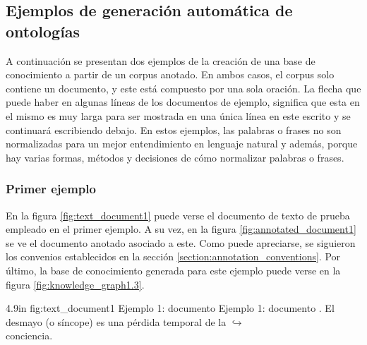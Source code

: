\subsection{Ejemplos de generación automática de ontologías}
A continuación se presentan dos ejemplos de la creación de una base de conocimiento a partir de un corpus anotado. En ambos casos, el corpus solo contiene un documento, y este está compuesto por una sola oración. La flecha que puede haber en algunas líneas de los documentos de ejemplo, significa que esta en el mismo es muy larga para ser mostrada en una única línea en este escrito y se continuará escribiendo debajo. En estos ejemplos, las palabras o frases no son normalizadas para un mejor entendimiento en lenguaje natural y además, porque hay varias formas, métodos y decisiones de cómo normalizar palabras o frases.

\subsubsection{Primer ejemplo}
En la figura \ref{fig:text_document1} puede verse el documento de texto de prueba empleado en el primer ejemplo. A su vez, en la figura \ref{fig:annotated_document1} se ve el documento anotado asociado a este. Como puede apreciarse, se siguieron los convenios establecidos en la sección \ref{section:annotation_conventions}. Por último, la base de conocimiento generada para este ejemplo puede verse en la figura \ref{fig:knowledge_graph1.3}.

\begin{annexample}
	[backgroundcolor=black!5]
	{4.9in}
	{fig:text_document1}
	{Ejemplo 1: documento }
	{Ejemplo 1: documento .}
	El desmayo (o síncope) es una pérdida temporal de la {\scriptsize $\hookrightarrow$}\\
	conciencia.
\end{annexample}

